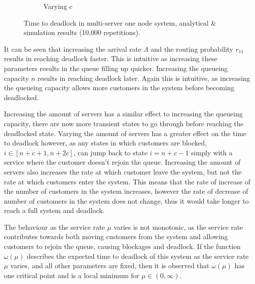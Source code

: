 \documentclass{article}
\numberwithin{equation}{section}
\begin{document}
\begin{figure}[!htbp]
\begin{center}
\begin{subfigure}[b]{0.48\textwidth}
    \caption{Varying $c$}
    \label{fig:1Nms_c}
  \end{subfigure}
  \end{center}
  \caption{Time to deadlock in multi-server one node system, analytical \&
  simulation results (10,000 repetitions).}
  \label{fig:timestodeadlock1nodemultiserver}
\end{figure}

It can be seen that increasing the arrival rate $\Lambda$ and the routing
probability $r_{11}$ results in reaching deadlock faster.
This is intuitive as increasing these parameters results in the queue filling
up quicker.
Increasing the queueing capacity $n$ results in reaching deadlock later.
Again this is intuitive, as increasing the queueing capacity allows more
customers in the system before becoming deadlocked.

Increasing the amount of servers has a similar effect to increasing the
queueing capacity, there are now more transient states to go through before
reaching the deadlocked state.
Varying the amount of servers has a greater effect on the time to deadlock
however, as any states in which customers are blocked, $i \in [n+c+1, n+2c]$,
can jump back to state $i=n+c-1$ simply with a service where the customer
doesn't rejoin the queue.
Increasing the amount of servers also increases the rate at which customer leave
the system, but not the rate at which customers enter the system.
This means that the rate of increase of the number of customers in the system
increases, however the rate of decrease of number of customers in the system
does not change, thus it would take longer to reach a full system and deadlock.

The behaviour as the service rate $\mu$ varies is not monotonic, as the
service rate contributes towards both moving customers from the system and
allowing customers to rejoin the queue, causing blockages and deadlock.
If the function $\omega(\mu)$ describes the expected time to deadlock of this
system as the service rate $\mu$ varies, and all other parameters are
fixed, then it is observed that $\omega(\mu)$ has one critical point and is a
local minimum for $\mu \in (0, \infty)$.
\end{document}
